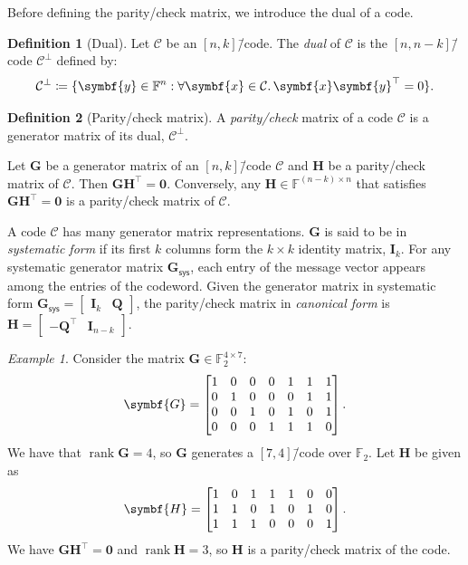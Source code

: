 \documentclass[version=last, paper=A4, parskip=half, oneside,%
toc=bibliography, toc=listof, listof=leveldown]{scrbook}
\theoremstyle{plain}
\theoremstyle{definition}
\newtheorem{definition}{Definition}
\theoremstyle{remark}
\newtheorem*{example}{Example}
\renewcommand*{\vec}{\symbf}
\newcommand*{\mat}{\symbf}
\newcommand*{\trans}{\top}%
\DeclareMathOperator{\rank}{rank}
\newcommand*{\FF}{\ensuremath{\mathbb{F}}}
\newcommand*{\sys}{\ensuremath{\mathsf{sys}}}
\begin{document}
Before defining the parity\-/check matrix, we introduce the dual of a code.

\begin{definition}[Dual]
  Let \(\mathcal{C}\) be an \([n, k]\)\=/code.  The \emph{dual} of
  \(\mathcal{C}\) is the \([n, n - k]\)\=/code \(\mathcal{C}^{\perp}\) defined
  by:
  \[
    \mathcal{C}^{\perp} \coloneqq
    \{\vec{y} \in \FF^n : \forall \vec{x} \in \mathcal{C}\ldotp \vec{x} \vec{y}^{\trans} = 0\}\text.
  \]
\end{definition}

\begin{definition}[Parity\-/check matrix]
  A \emph{parity\-/check} matrix of a code \(\mathcal{C}\) is a generator matrix
  of its dual, \(\mathcal{C}^{\perp}\).
\end{definition}

Let \(\mat{G}\) be a generator matrix of an \([n, k]\)\=/code \(\mathcal{C}\)
and \(\mat{H}\) be a parity\-/check matrix of \(\mathcal{C}\).  Then
\(\mat{G} \mat{H}^{\trans} = \vec{0}\).  Conversely, any
\(\mat{H} \in \FF^{(n - k) \times n}\) that satisfies
\(\mat{G} \mat{H}^{\trans} = \vec{0}\) is a parity\-/check matrix of
\(\mathcal{C}\).

A code \(\mathcal{C}\) has many generator matrix representations.  \(\mat{G}\)
is said to be in \emph{systematic form} if its first \(k\) columns form the
\(k \times k\) identity matrix, \(\mat{I}_k\).  For any systematic generator
matrix \(\mat{G}_{\sys}\), each entry of the message vector appears among the
entries of the codeword.  Given the generator matrix in systematic form
\(\mat{G}_{\sys} = \begin{bmatrix} \mat{I}_k & \mat{Q} \end{bmatrix}\), the
parity\-/check matrix in \emph{canonical form} is
\(\mat{H} = \begin{bmatrix} -\mat{Q}^{\trans} & \mat{I}_{n - k} \end{bmatrix}\).

\begin{example}
  Consider the matrix \(\mat{G} \in \FF_2^{4 \times 7}\):
  \[
    \mat{G} =
    \begin{bmatrix}
      1 & 0 & 0 & 0 & 1 & 1 & 1 \\
      0 & 1 & 0 & 0 & 0 & 1 & 1 \\
      0 & 0 & 1 & 0 & 1 & 0 & 1 \\
      0 & 0 & 0 & 1 & 1 & 1 & 0
    \end{bmatrix}\text.
  \]
  We have that \(\rank \mat{G} = 4\), so \(\mat{G}\) generates a
  \([7, 4]\)\=/code over \(\FF_2\).  Let \(\mat{H}\) be given as
  \[
    \mat{H} =
    \begin{bmatrix}
      1 & 0 & 1 & 1 & 1 & 0 & 0 \\
      1 & 1 & 0 & 1 & 0 & 1 & 0 \\
      1 & 1 & 1 & 0 & 0 & 0 & 1
    \end{bmatrix}\text.
  \]
  We have \(\mat{G} \mat{H}^{\trans} = \vec{0}\) and \(\rank \mat{H} = 3\), so
  \(\mat{H}\) is a parity\-/check matrix of the code.
\end{example}
\end{document}

